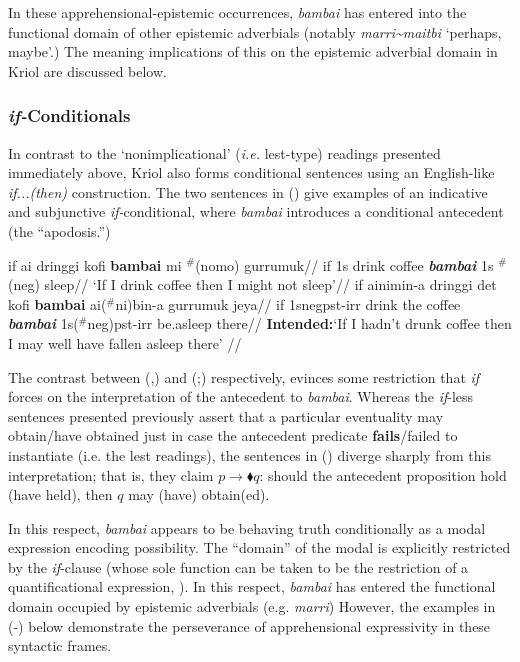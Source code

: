 \documentclass[11pt]{article}
\begin{document}
In these apprehensional-epistemic occurrences, \textit{bambai} has entered into the functional domain of other epistemic adverbials (notably \textit{marri\textasciitilde{maitbi}} `perhaps, maybe'.) The meaning implications of this on the epistemic adverbial domain in Kriol are discussed below.

\subsubsection{\textit{if-}Conditionals}\label{ifs}
In contrast to the `nonimplicational' (\textit{i.e. }{\sc lest}-type) readings presented immediately above, Kriol also forms conditional sentences using an English-like \textit{if...(then)} construction. The two sentences in (\nextx) give examples of an indicative and subjunctive \textit{if-}conditional, where \textit{bambai} introduces a conditional antecedent (the ``apodosis.'') 


\pex\a{}\begingl %
\gla if ai dringgi kofi \textbf{bambai} mi $^\#$(nomo) gurrumuk//
\glb if 1s drink coffee \textit{\textbf{bambai}} 1s $^\#$({\sc neg}) sleep//
\glft `If I drink coffee then I might not sleep'\trailingcitation{[AJ~23022017]}//
\endgl
\a{}\begingl\gla if ai\textdblhyphen{}ni\textdblhyphen{}min-a dringgi det kofi \textbf{bambai} ai($^\#$\textdblhyphen{}ni)\textdblhyphen{}bin-a gurrumuk jeya//
\glb if 1s{\sc\textdblhyphen{}neg\textdblhyphen{}pst-irr} drink the coffee \textit{\textbf{bambai}} 1s{\sc($^\#$\textdblhyphen{}neg)\textdblhyphen{}pst-irr} be.asleep there//
\glft\textbf{Intended:}`If I hadn't drunk coffee then I may well have fallen asleep there' \trailingcitation{[GT~16032017]}//
\endgl\xe

The contrast between (,) and (;) respectively, evinces some restriction that \textit{if} forces on the interpretation of the antecedent to \textit{bambai}. Whereas the \textit{if}-less sentences presented previously assert that a particular eventuality may obtain/have obtained just in case the antecedent predicate \textbf{fails}/failed to instantiate (i.e. the {\sc lest} readings), the sentences in () diverge sharply from this interpretation; that is, they claim $p\to\blacklozenge q$: should the antecedent proposition hold (have held), then $q$ may (have) obtain(ed). 

In this respect, \textit{bambai} appears to be behaving truth conditionally as a modal expression encoding possibility. The ``domain'' of the modal is explicitly restricted by the \textit{if}-clause (whose sole function can be taken to be the restriction of a quantificational expression, \citealp[cf.][]{Kratzer1979,Lewis1975}). In this respect, \textit{bambai} has entered the functional domain occupied by epistemic adverbials (e.g. \textit{marri}) However, the examples in (-) below demonstrate the perseverance of apprehensional expressivity in these syntactic frames.
\end{document}
